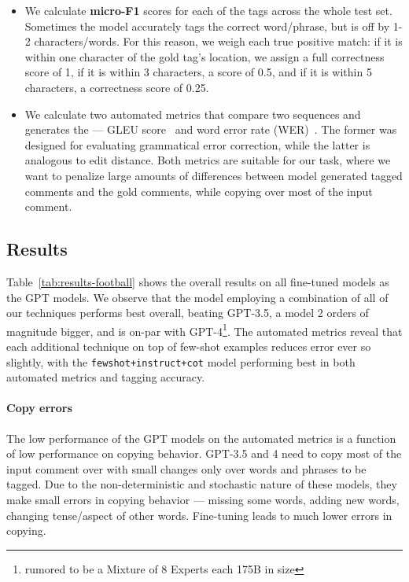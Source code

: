 \begin{itemize}
    \item We calculate \textbf{micro-F1} scores for each of the tags across the whole test set. Sometimes the model accurately tags the correct word/phrase, but is off by 1-2 characters/words. For this reason, we weigh each true positive match: if it is within one character of the gold tag's location, we assign a full correctness score of 1, if it is within 3 characters, a score of 0.5, and if it is within 5 characters, a correctness score of 0.25.
    \item We calculate two automated metrics that compare two sequences and generates the --- GLEU score~\citep{napoles-EtAl:2015:ACL-IJCNLP} and word error rate (WER)~\citep{woodard1982}. The former was designed for evaluating grammatical error correction, while the latter is analogous to edit distance. Both metrics are suitable for our task, where we want to penalize large amounts of differences between model generated tagged comments and the gold comments, while copying over most of the input comment.
\end{itemize}


\subsection{Results}



Table~\ref{tab:results-football} shows the overall results on all fine-tuned models as the GPT models. We observe that the model employing a combination of all of our techniques performs best overall, beating GPT-3.5, a model 2 orders of magnitude bigger, and is on-par with GPT-4\footnote{rumored to be a Mixture of 8 Experts each 175B in size}. The automated metrics reveal that each additional technique on top of few-shot examples reduces error ever so slightly, with the \texttt{fewshot+instruct+cot} model performing best in both automated metrics and tagging accuracy.

\paragraph{Copy errors} The low performance of the GPT models on the automated metrics is a function of low performance on copying behavior. GPT-3.5 and 4 need to copy most of the input comment over with small changes only over words and phrases to be tagged. Due to the non-deterministic and stochastic nature of these models, they make small errors in copying behavior --- missing some words, adding new words, changing tense/aspect of other words. Fine-tuning leads to much lower errors in copying.

